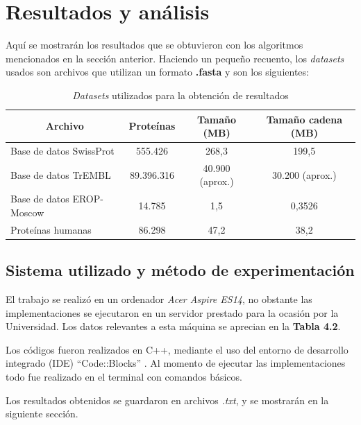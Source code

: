 \chapter{Resultados y análisis}

Aquí se mostrarán los resultados que se obtuvieron con los algoritmos mencionados en la sección anterior. Haciendo un pequeño recuento, los \textit{datasets} usados son archivos que utilizan un formato \textbf{.fasta} y son los siguientes:

\begin{table}[h]
\centering
\begin{tabular}{|l|c|c|c|}
\hline
\multicolumn{1}{|c|}{\textbf{Archivo}} & \textbf{Proteínas} & \textbf{Tamaño (MB)} & \textbf{Tamaño cadena (MB)} \\ \hline
Base de datos SwissProt    & 555.426                & 268,3                & 199,5              \\
Base de datos TrEMBL        & 89.396.316              & 40.900 (aprox.)       & 30.200 (aprox.)     \\
Base de datos EROP-Moscow        & 14.785                 & 1,5                  & 0,3526                \\
Proteínas humanas     & 86.298                 & 47,2                 & 38,2               \\ \hline
\end{tabular}
\caption{\textit{Datasets} utilizados para la obtención de resultados}
\label{tb:labelr1}
\end{table} 

\section{Sistema utilizado y método de experimentación}

El trabajo se realizó en un ordenador \textit{Acer Aspire ES14}, no obstante las implementaciones se ejecutaron en un servidor prestado para la ocasión por la Universidad. Los datos relevantes a esta máquina se aprecian en la \textbf{Tabla 4.2}.

Los códigos fueron realizados en C++, mediante el uso del entorno de desarrollo integrado (IDE) ``Code::Blocks'' \cite{codeblocks}. Al momento de ejecutar las implementaciones todo fue realizado en el terminal con comandos básicos.

Los resultados obtenidos se guardaron en archivos \textit{.txt}, y se mostrarán en la siguiente sección.

\newpage

